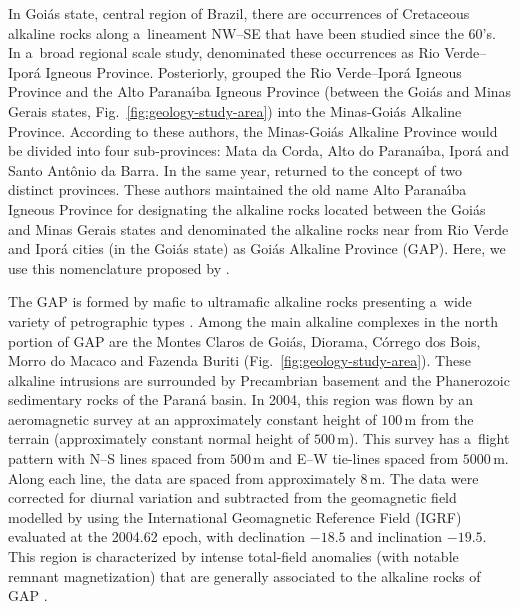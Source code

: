 \documentclass[journal abbreviation, npg]{copernicus}
\begin{document}
In Goi\'{a}s state, central region of Brazil, there are occurrences of
Cretaceous alkaline rocks along a~lineament NW--SE that have been studied
since the 60's. In a~broad regional scale study, \citet{almeida1983}
denominated these occurrences as Rio Verde--Ipor\'{a} Igneous Province.
Posteriorly, \citet{sgarbi2002} grouped the Rio Verde--Ipor\'{a} Igneous
Province and the Alto Parana\'{\i}ba Igneous Province (between the Goi\'{a}s
and Minas Gerais states, Fig.~\ref{fig:geology-study-area}) into the
Minas-Goi\'{a}s Alkaline Province. According to these authors, the
Minas-Goi\'{a}s Alkaline Province would be divided into four sub-provinces:
Mata da Corda, Alto do Parana\'{\i}ba, Ipor\'{a} and Santo Ant\^{o}nio da
Barra. In the same year, \citet{junqueira-brod2002} returned to the concept
of two distinct provinces. These authors maintained the old name Alto
Parana\'{\i}ba Igneous Province for designating the alkaline rocks located
between the Goi\'{a}s and Minas Gerais states and denominated the alkaline
rocks near from Rio Verde and Ipor\'{a} cities (in the Goi\'{a}s state) as
Goi\'{a}s Alkaline Province (GAP). Here, we use this nomenclature proposed by
\citet{junqueira-brod2002}.

The GAP is formed by mafic to ultramafic alkaline rocks presenting a~wide
variety of petrographic types
\citep{almeida1983,junqueira-brod2005,carlson-etal2007,marangoni-mantovani2013}.
Among the main alkaline complexes in the north portion of GAP are the Montes
Claros de Goi\'{a}s, Diorama, C\'{o}rrego dos Bois, Morro do Macaco and
Fazenda Buriti (Fig.~\ref{fig:geology-study-area}). These alkaline intrusions
are surrounded by Precambrian basement and the Phanerozoic sedimentary rocks
of the Paran\'{a} basin. In 2004, this region was flown by an aeromagnetic
survey at an approximately constant height of $100$\,\unit{m} from the
terrain (approximately constant normal height of $500$\,\unit{m}). This
survey has a~flight pattern with N--S lines spaced from $500$\,\unit{m} and
E--W tie-lines spaced from $5000$\,\unit{m}. Along each line, the data are
spaced from approximately $8$\,\unit{m}. The data were corrected for diurnal
variation and subtracted from the geomagnetic field modelled by using the
International Geomagnetic Reference Field (IGRF) evaluated at the 2004.62
epoch, with declination $-18.5${\degree} and inclination $-19.5${\degree}.
This region is characterized by intense total-field anomalies (with notable
remnant magnetization) that are generally associated to the alkaline rocks of
GAP \citep{dutra-marangoni2009,dutra-etal2012,marangoni-mantovani2013}.
\end{document}
